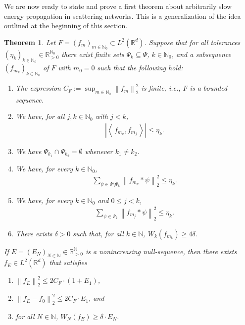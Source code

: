 \documentclass[11pt]{amsart}
\newcommand{\R}{{\mathbb{R}}}
\newcommand{\N}{\mathbb{N}}
\newcommand{\norm}[1]{\ensuremath{\left\lVert\text{}#1\text{}\right\rVert}}
\newcommand{\ip}[1]{\ensuremath{\left<\text{} \, #1 \, \text{}\right>}}
\newtheorem{theorem}{Theorem}[section]
\newenvironment{proof sketch} {\textit{Proof sketch.}}{}
\newenvironment{myenum}
{ \begin{enumerate}
    \setlength{\itemsep}{3pt}
    \setlength{\parskip}{0pt}
    \setlength{\parsep}{0pt}     }
{ \end{enumerate}                  }
\begin{document}
  We are now ready to state and prove a first theorem about arbitrarily slow energy propagation in scattering networks. This is a generalization of the idea outlined at the beginning of this section.
  
  \begin{theorem}\label{thm: Arbitrarily slow convergence of W_N}
    Let $F=(f_m)_{m\in \N_0} \subset L^2(\R^d)$. Suppose that for all tolerances $(\eta_k)_{k \in \N_0} \in \R_{>0}^{\N_0}$ there exist finite sets $\Psi_k\subseteq \Psi$, $k \in \N_0$, and a subsequence $(f_{m_k})_{k \in \N_0}$ of $F$ with $m_0=0$ such that the following hold:
    \begin{myenum}
      \item[(i)] The expression $C_F:=\sup_{m \in \N_0}\norm{f_m}_2^2$ is finite, i.e., $F$ is a bounded sequence.
      \item[(ii)] We have, for all $j,k \in \N_0$ with $j<k$, 
      \begin{align*}
        \left|\ip{f_{m_k},f_{m_j}}\right|\leq \eta_k.
      \end{align*}
      \item[(iii)] We have $\Psi_{k_1}\cap \Psi_{k_2}=\emptyset$ whenever $k_1\neq k_2$. 
      \item[(iv)] We have, for every $k \in \N_0$,
      \begin{align*}
        \sum_{\psi \in \Psi\setminus\Psi_k} \norm{f_{m_k}*\psi}_2^2 \leq \eta_k.
      \end{align*}  
      \item[(v)] We have, for every $k \in \N_0$ and $0\leq j < k$,
      \begin{align*}
        \sum_{\psi \in \Psi_k} \norm{f_{m_j}*\psi}_2^2 \leq \eta_k.
      \end{align*}
      \item[(vi)] There exists $\delta>0$ such that, for all $k \in \N$, $W_k(f_{m_k})\geq 4 \delta$.
    \end{myenum}
  
    If $E=(E_N)_{N \in \N}\in \R_{>0}^\N$ is a nonincreasing null-sequence, then there exists $f_E \in L^2(\R^d)$ that satisfies
    \begin{myenum}
      \item[a)] $\norm{f_E}_2^2\leq 2 C_F \cdot (1+E_1)$,
      \item[b)] $\norm{f_E-f_0}_2^2\leq 2 C_F \cdot E_1$, and
      \item[c)] for all $N\in \N$, $W_N(f_E)\geq \delta \cdot E_N$.
    \end{myenum}
  \end{theorem}
  
\end{document}
